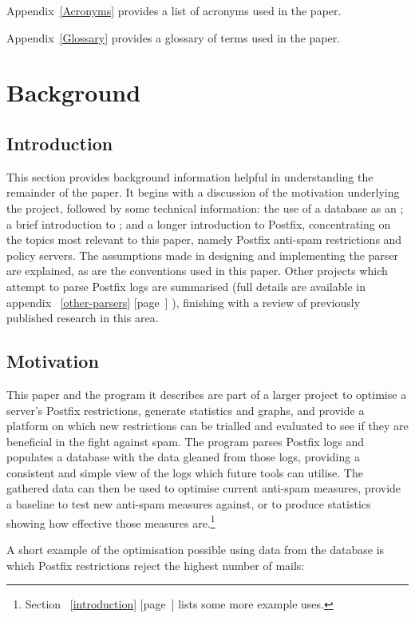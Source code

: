 \documentclass[a4paper,12pt,draft]{article}
\newcommand{\refwithpage}[1]{%
    \empty{}\ref{#1} [page~\pageref{#1}]%
}
\begin{document}
Appendix~\ref{Acronyms} provides a list of acronyms used in the paper.

Appendix~\ref{Glossary} provides a glossary of terms used in the paper.

\section{Background}

\label{background}

\subsection{Introduction}

This section provides background information helpful in understanding the
remainder of the paper.  It begins with a discussion of the motivation
underlying the project, followed by some technical information: the use of
a database as an \API\@; a brief introduction to
 \SMTP\@; and a longer introduction to
Postfix, concentrating on the topics most relevant to this paper, namely
Postfix anti-spam restrictions and policy servers.  The assumptions made in
designing and implementing the parser are explained, as are the conventions
used in this paper.  Other projects which attempt to parse Postfix logs are
summarised (full details are available in
appendix~\refwithpage{other-parsers}), finishing with a review of
previously published research in this area.

\subsection{Motivation}

This paper and the program it describes are part of a larger project to
optimise a server's Postfix restrictions, generate statistics and graphs,
and provide a platform on which new restrictions can be trialled and
evaluated to see if they are beneficial in the fight against spam.  The
program parses Postfix logs and populates a database with the data gleaned
from those logs, providing a consistent and simple view of the logs which
future tools can utilise.  The gathered data can then be used to optimise
current anti-spam measures, provide a baseline to test new anti-spam
measures against, or to produce statistics showing how effective those
measures are.\footnote{Section~\refwithpage{introduction} lists some more
example uses.}

A short example of the optimisation possible using data from the database
is which Postfix restrictions reject the highest number of mails:
\end{document}
